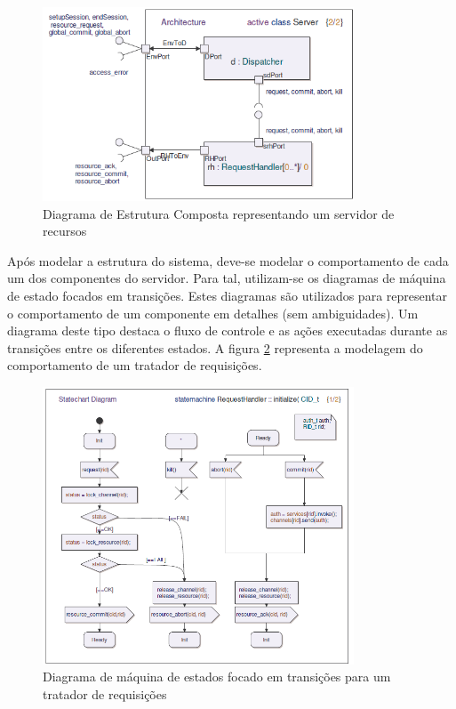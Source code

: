 \begin{figure}
	\centering
	\includegraphics[width=350px]{img/weavr_composite_structure.png}
	\caption{Diagrama de Estrutura Composta
	representando um servidor de recursos}\label{fig:weavr_composite_structure}
\end{figure}

Após modelar a estrutura do sistema, deve-se modelar o comportamento de cada um dos componentes do servidor. Para tal, utilizam-se os diagramas de
máquina de estado focados em transições. Estes diagramas são utilizados para representar o comportamento de um componente em detalhes (sem
ambiguidades). Um diagrama deste tipo destaca o fluxo de controle e as ações executadas durante as transições entre os diferentes estados. A figura
\ref{fig:weavr_state_machine_base} representa a modelagem do comportamento de um tratador de requisições.

\begin{figure}
	\centering
	\includegraphics[width=350px]{img/weavr_state_machine_base.png}
	\caption{Diagrama de máquina de estados focado em transições
	para um tratador de requisições}\label{fig:weavr_state_machine_base}
\end{figure}

